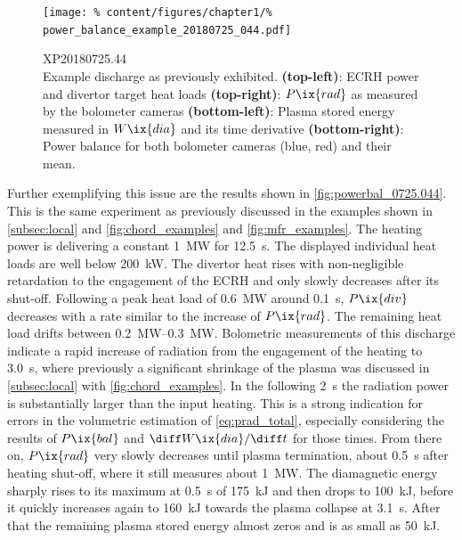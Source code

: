 %
            \begin{figure}[t]%
                \centering%
                \texttt{[image: \%
                    content/figures/chapter1/\%
                    power\_balance\_example\_20180725\_044.pdf]}%
                \caption{%
                    XP20180725.44\\%
                    Example discharge as previously exhibited. \textbf{(top-left)}: ECRH power and divertor target heat loads \textbf{(top-right)}: $P\ix{rad}$ as measured by the bolometer cameras \textbf{(bottom-left)}: Plasma stored energy measured in $W\ix{dia}$ and its time derivative \textbf{(bottom-right)}: Power balance for both bolometer cameras (blue, red) and their mean.}\label{fig:powerbal_0725.044}%
            \end{figure}%
%
            Further exemplifying this issue are the results shown in \autoref{fig:powerbal_0725.044}. This is the same experiment as previously discussed in the examples shown in \cref{subsec:local} and \cref{fig:chord_examples} and \cref{fig:mfr_examples}. The heating power is delivering a constant \SI{1}{\mega\watt} for \SI{12.5}{\second}. The displayed individual heat loads are well below \SI{200}{\kilo\watt}. The divertor heat rises with non-negligible retardation to the engagement of the ECRH and only slowly decreases after its shut-off. Following a peak heat load of \SI{0.6}{\mega\watt} around \SI{0.1}{\second}, $P\ix{div}$ decreases with a rate similar to the increase of $P\ix{rad}$. The remaining heat load drifts between \SIrange{0.2}{0.3}{\mega\watt}. Bolometric measurements of this discharge indicate a rapid increase of radiation from the engagement of the heating to \SI{3.0}{\second}, where previously a significant shrinkage of the plasma was discussed in \cref{subsec:local} with \cref{fig:chord_examples}. In the following \SI{2}{\second} the radiation power is substantially larger than the input heating. This is a strong indication for errors in the volumetric estimation of \cref{eq:prad_total}, especially considering the results of $P\ix{bal}$ and $\diff W\ix{dia}/\diff t$ for those times. From there on, $P\ix{rad}$ very slowly decreases until plasma termination, about \SI{0.5}{\second} after heating shut-off, where it still measures about \SI{1}{\mega\watt}. The diamagnetic energy sharply rises to its maximum at \SI{0.5}{\second} of \SI{175}{\kilo\joule} and then drops to \SI{100}{\kilo\joule}, before it quickly increases again to \SI{160}{\kilo\joule} towards the plasma collapse at \SI{3.1}{\second}. After that the remaining plasma stored energy almost zeros and is as small as \SI{50}{\kilo\joule}.\\%

